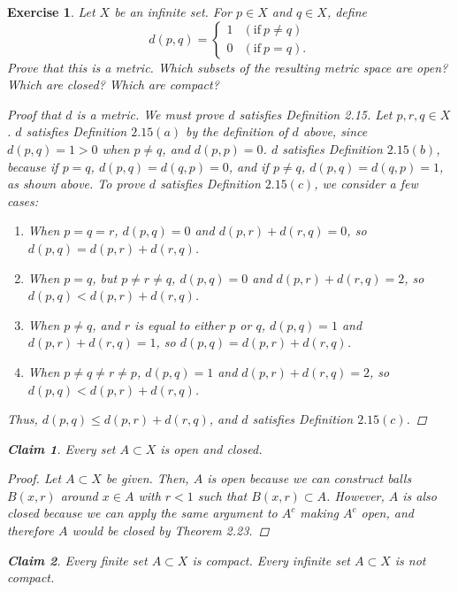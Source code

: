 \documentclass[10pt,letterpaper]{amsart}
\newtheorem{exercise}{Exercise}[section]
\newtheorem*{claim}{Claim}
\theoremstyle{definition}
\theoremstyle{remark}
\numberwithin{equation}{exercise}
\begin{document}
\begin{multicols}{2}
\begin{exercise}
    Let $X$ be an infinite set. For $p \in X$ and $q \in X$, define
    \begin{equation*}
      d(p,q) = \begin{cases}
        1 & (\mathrm{if}\ p \ne q)\\
        0 & (\mathrm{if}\ p = q).
      \end{cases}
    \end{equation*}
    Prove that this is a metric. Which subsets of the resulting metric space are open? Which are closed? Which are compact?
    \begin{proof}[Proof that $d$ is a metric]
      We must prove $d$ satisfies Definition 2.15. Let $p,r,q \in X$. $d$ satisfies Definition $2.15(a)$ by the definition of $d$ above, since $d(p,q) = 1 > 0$ when $p \ne q$, and $d(p,p) = 0$. $d$ satisfies Definition $2.15(b)$, because if $p = q$, $d(p,q) = d(q,p) = 0$, and if $p \ne q$, $d(p,q) = d(q,p) = 1$, as shown above. To prove $d$ satisfies Definition $2.15(c)$, we consider a few cases:
      \begin{enumerate}
        \item When $p = q = r$, $d(p,q) = 0$ and $d(p,r) + d(r,q) = 0$, so $d(p,q) = d(p,r) + d(r,q)$.
        \item When $p = q$, but $p \ne r \ne q$, $d(p,q) = 0$ and $d(p,r) + d(r,q) = 2$, so $d(p,q) < d(p,r) + d(r,q)$.
        \item When $p \ne q$, and $r$ is equal to either $p$ or $q$, $d(p,q) = 1$ and $d(p,r) + d(r,q) = 1$, so $d(p,q) = d(p,r) + d(r,q)$.
        \item When $p \ne q \ne r \ne p$, $d(p,q) = 1$ and $d(p,r) + d(r,q) = 2$, so $d(p,q) < d(p,r) + d(r,q)$.
      \end{enumerate}
      Thus, $d(p,q) \le d(p,r) + d(r,q)$, and $d$ satisfies Definition $2.15(c)$.
    \end{proof}
    \begin{claim}
      Every set $A \subset X$ is open and closed.
    \end{claim}
    \begin{proof}
      Let $A \subset X$ be given. Then, $A$ is open because we can construct balls $B(x,r)$ around $x \in A$ with $r < 1$ such that $B(x,r) \subset A$. However, $A$ is also closed because we can apply the same argument to $A^c$ making $A^c$ open, and therefore $A$ would be closed by Theorem 2.23.
    \end{proof}
    \begin{claim}
      Every finite set $A \subset X$ is compact. Every infinite set $A \subset X$ is not compact.

\end{claim}
\end{exercise}
\end{multicols}
\end{document}
